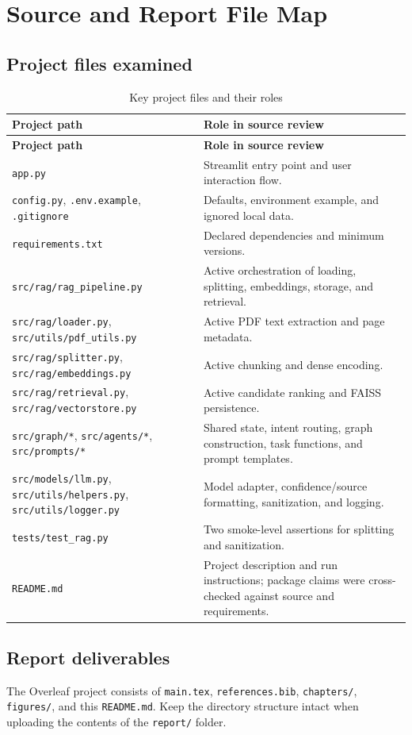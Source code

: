 \chapter{Source and Report File Map}
\label{app:source-map}

\section{Project files examined}
\begin{longtable}{p{}p{}}
\caption{Key project files and their roles}\label{tab:source-map}\\
\toprule
\textbf{Project path} & \textbf{Role in source review}\\
\midrule
\endfirsthead
\toprule
\textbf{Project path} & \textbf{Role in source review}\\
\midrule
\endhead
\texttt{app.py} & Streamlit entry point and user interaction flow.\\
\texttt{config.py}, \texttt{.env.example}, \texttt{.gitignore} & Defaults, environment example, and ignored local data.\\
\texttt{requirements.txt} & Declared dependencies and minimum versions.\\
\texttt{src/rag/rag\_pipeline.py} & Active orchestration of loading, splitting, embeddings, storage, and retrieval.\\
\texttt{src/rag/loader.py}, \texttt{src/utils/pdf\_utils.py} & Active PDF text extraction and page metadata.\\
\texttt{src/rag/splitter.py}, \texttt{src/rag/embeddings.py} & Active chunking and dense encoding.\\
\texttt{src/rag/retrieval.py}, \texttt{src/rag/vectorstore.py} & Active candidate ranking and FAISS persistence.\\
\texttt{src/graph/*}, \texttt{src/agents/*}, \texttt{src/prompts/*} & Shared state, intent routing, graph construction, task functions, and prompt templates.\\
\texttt{src/models/llm.py}, \texttt{src/utils/helpers.py}, \texttt{src/utils/logger.py} & Model adapter, confidence/source formatting, sanitization, and logging.\\
\texttt{tests/test\_rag.py} & Two smoke-level assertions for splitting and sanitization.\\
\texttt{README.md} & Project description and run instructions; package claims were cross-checked against source and requirements.\\
\bottomrule
\end{longtable}

\section{Report deliverables}
The Overleaf project consists of \texttt{main.tex}, \texttt{references.bib}, \texttt{chapters/}, \texttt{figures/}, and this \texttt{README.md}. Keep the directory structure intact when uploading the contents of the \texttt{report/} folder.
